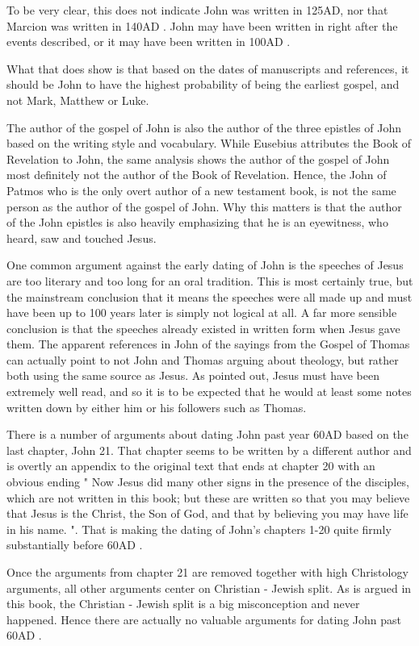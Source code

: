 To be very clear, this does not indicate John was written in 125AD, nor that Marcion was written in 140AD .
John may have been written in right after the events described, or it may have been written in 100AD .

What that does show is that based on the dates of manuscripts and references, it should be John to have the highest probability of being the earliest gospel, and not Mark, Matthew or Luke.

The author of the gospel of John is also the author of the three epistles of John based on the writing style and vocabulary.
While Eusebius attributes the Book of Revelation to John, the same analysis shows the author of the gospel of John most definitely not the author of the Book of Revelation.
Hence, the John of Patmos who is the only overt author of a new testament book, is not the same person as the author of the gospel of John.
Why this matters is that the author of the John epistles is also heavily emphasizing that he is an eyewitness, who heard, saw and touched Jesus.

One common argument against the early dating of John is the speeches of Jesus are too literary and too long for an oral tradition.
This is most certainly true, but the mainstream conclusion that it means the speeches were all made up and must have been up to 100 years later is simply not logical at all.
A far more sensible conclusion is that the speeches already existed in written form when Jesus gave them.
The apparent references in John of the sayings from the Gospel of Thomas can actually point to not John and Thomas arguing about theology, but rather both using the same source as Jesus.
As pointed out, Jesus must have been extremely well read, and so it is to be expected that he would at least some notes written down by either him or his followers such as Thomas.

There is a number of arguments about dating John past year 60AD based on the last chapter, John 21.
That chapter seems to be written by a different author and is overtly an appendix to the original text that ends at chapter 20 with an obvious ending "
Now Jesus did many other signs in the presence of the disciples, which are not written in this book;
but these are written so that you may believe that Jesus is the Christ, the Son of God, and that by believing you may have life in his name.
".
That is making the dating of John's chapters 1-20 quite firmly substantially before 60AD .

Once the arguments from chapter 21 are removed together with high Christology arguments, all other arguments center on Christian - Jewish split.
As is argued in this book, the Christian - Jewish split is a big misconception and never happened.
Hence there are actually no valuable arguments for dating John past 60AD .

